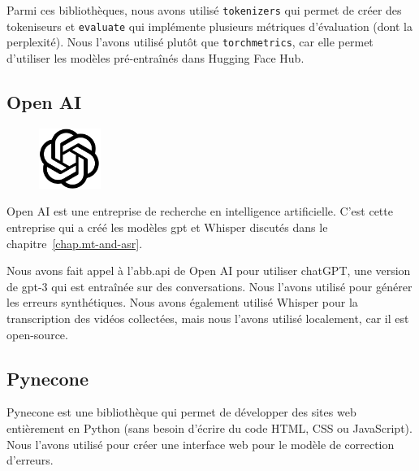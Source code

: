 Parmi ces bibliothèques, nous avons utilisé \verb|tokenizers| qui permet de créer des tokeniseurs
et \verb|evaluate| qui implémente plusieurs métriques d'évaluation (dont la perplexité).
Nous l'avons utilisé plutôt que \verb|torchmetrics|, 
car elle permet d'utiliser les modèles pré-entraînés dans \foreignlanguage{english}{Hugging Face Hub}.

\subsection{\foreignlanguage{english}{Open AI}}
\label{subsec.openai}

\begin{figure}
    \vspace*{-\topsep}
    \begin{flushright}
        \includegraphics[width=2cm]{assets/images/openai.png}
    \end{flushright}
\end{figure}
\foreignlanguage{english}{Open AI} est une entreprise de recherche en intelligence artificielle.
C'est cette entreprise qui a créé les modèles \gls{gpt} et Whisper discutés dans le chapitre~\ref{chap.mt-and-asr}.

Nous avons fait appel à l'\gls{abb.api} de \foreignlanguage{english}{Open AI} pour utiliser chatGPT,
une version de \gls{gpt}-3 qui est entraînée sur des conversations.
Nous l'avons utilisé pour générer les erreurs synthétiques.
Nous avons également utilisé Whisper pour la transcription des vidéos collectées,
mais nous l'avons utilisé localement, car il est open-source.

\subsection{Pynecone}
\label{subsec.pynecone}


Pynecone est une bibliothèque qui permet de développer des sites web entièrement en Python
(sans besoin d'écrire du code HTML, CSS ou JavaScript).
Nous l'avons utilisé pour créer une interface web pour le modèle de correction d'erreurs.